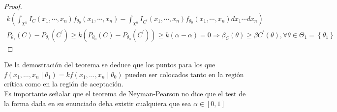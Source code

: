 \begin{proof}
$$\begin{gathered}
k\left(\int_{\chi^{n}} I_{C}\left(x_{1}, \cdots, x_{n}\right) f_{\theta_{0}}\left(x_{1}, \cdots, x_{n}\right)-\int_{\chi^{n}} I_{C^{\prime}}\left(x_{1}, \cdots, x_{n}\right) f_{\theta_{0}}\left(x_{1}, \cdots, x_{n}\right) d x_{1} \cdots d x_{n}\right) \\
P_{\theta_{1}}(C)-P_{\theta_{1}}\left(C^{\prime}\right) \geq k\left(P_{\theta_{0}}(C)-P_{\theta_{0}}\left(C^{\prime}\right)\right) \geq k(\alpha-\alpha)=0 \Rightarrow \beta_{C}(\theta) \geq \beta C^{\prime}(\theta), \forall \theta \in \Theta_{1}=\left\{\theta_{1}\right\}
\end{gathered}
$$
\end{proof}

\begin{observación}
De la demostración del teorema se deduce que los puntos para los que $f\left(x_{1}, \ldots, x_{n} \mid \theta_{1}\right)=k f\left(x_{1}, \ldots, x_{n} \mid \theta_{0}\right)$ pueden ser colocados tanto en la región crítica como en la región de aceptación.\\
Es importante señalar que el teorema de Neyman-Pearson no dice que el test de la forma dada en su enunciado deba existir cualquiera que sea $\alpha \in[0,1]$
\end{observación}


